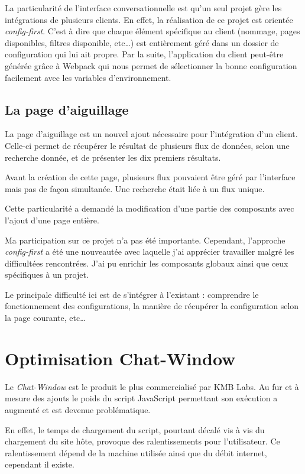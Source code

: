 \documentclass[12pt,a4paper,oneside]{scrreprt}
\begin{document}
La particularité de l'interface conversationnelle est qu'un seul projet gère les intégrations de plusieurs clients. En effet, la réalisation de ce projet est orientée \textit{config-first}. C'est à dire que chaque élément spécifique au client (nommage, pages disponibles, filtres disponible, etc\dots) est entièrement géré dans un dossier de configuration qui lui ait propre. Par la suite, l'application du client peut-être générée grâce à Webpack qui nous permet de sélectionner la bonne configuration facilement avec les variables d'environnement.

\subsection{La page d'aiguillage}

La page d'aiguillage est un nouvel ajout nécessaire pour l'intégration d'un client. Celle-ci permet de récupérer le résultat de plusieurs flux de données, selon une recherche donnée, et de présenter les dix premiers résultats.

Avant la création de cette page, plusieurs flux pouvaient être géré par l'interface mais pas de façon simultanée. Une recherche était liée à un flux unique.

Cette particularité a demandé la modification d'une partie des composants avec l'ajout d'une page entière.

\begin{info}
	Ma participation sur ce projet n'a pas été importante. Cependant, l'approche \textit{config-first} a été une nouveautée avec laquelle j'ai apprécier travailler malgré les difficultées rencontrées. J'ai pu enrichir les composants globaux ainsi que ceux spécifiques à un projet.

	Le principale difficulté ici est de s'intégrer à l'existant : comprendre le fonctionnement des configurations, la manière de récupérer la configuration selon la page courante, etc\dots
\end{info}

\section{Optimisation Chat-Window}

Le \textit{Chat-Window} est le produit le plus commercialisé par KMB Labs. Au fur et à mesure des ajouts le poids du script JavaScript permettant son exécution a augmenté et est devenue problématique.

En effet, le temps de chargement du script, pourtant décalé vis à vis du chargement du site hôte, provoque des ralentissements pour l'utilisateur. Ce ralentissement dépend de la machine utilisée ainsi que du débit internet, cependant il existe.
\end{document}
